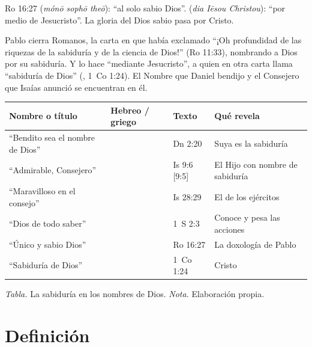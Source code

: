 \begin{filologiatexto}{Ro 16:27}
 (\emph{mónō sophō theō}): ``al solo sabio Dios''.  (\emph{dia Iēsou Christou}): ``por medio de Jesucristo''. La gloria del Dios sabio pasa por Cristo.
\end{filologiatexto}

Pablo cierra Romanos, la carta en que había exclamado ``¡Oh profundidad de las riquezas de la sabiduría y de la ciencia de Dios!'' (Ro 11:33), nombrando a Dios por su sabiduría. Y lo hace ``mediante Jesucristo'', a quien en otra carta llama ``sabiduría de Dios'' (, 1~Co 1:24). El Nombre que Daniel bendijo y el Consejero que Isaías anunció se encuentran en él.


\begin{center}
\small\renewcommand{\arraystretch}{1.2}
\begin{tabular}{@{}L{4.2cm}L{3.6cm}L{3.0cm}L{4.6cm}@{}}
\toprule
\textbf{Nombre o título} & \textbf{Hebreo / griego} & \textbf{Texto} & \textbf{Qué revela} \\ \midrule
``Bendito sea el nombre de Dios'' &  & Dn 2:20 & Suya es la sabiduría \\
``Admirable, Consejero'' &  & Is 9:6 [9:5] & El Hijo con nombre de sabiduría \\
``Maravilloso en el consejo'' &  & Is 28:29 & El \SENOR{} de los ejércitos \\
``Dios de todo saber'' &  & 1~S 2:3 & Conoce y pesa las acciones \\
``Único y sabio Dios'' &  & Ro 16:27 & La doxología de Pablo \\
``Sabiduría de Dios'' &  & 1~Co 1:24 & Cristo \\ \bottomrule
\end{tabular}\par\smallskip
{\footnotesize\color{gris}\textit{Tabla.} La sabiduría en los nombres de Dios. \textit{Nota.} Elaboración propia.}
\end{center}

\section{Definición}

